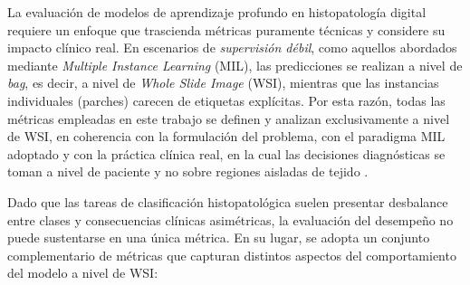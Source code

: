 
La evaluación de modelos de aprendizaje profundo en histopatología digital requiere un enfoque que trascienda métricas puramente técnicas y considere su impacto clínico real. En escenarios de \textit{supervisión débil}, como aquellos abordados mediante \textit{Multiple Instance Learning} (MIL), las predicciones se realizan a nivel de \textit{bag}, es decir, a nivel de \textit{Whole Slide Image} (WSI), mientras que las instancias individuales (parches) carecen de etiquetas explícitas. Por esta razón, todas las métricas empleadas en este trabajo se definen y analizan exclusivamente a nivel de WSI, en coherencia con la formulación del problema, con el paradigma MIL adoptado y con la práctica clínica real, en la cual las decisiones diagnósticas se toman a nivel de paciente y no sobre regiones aisladas de tejido \cite{campanella2019clinical} \cite{zhou2018brief}.\newline

Dado que las tareas de clasificación histopatológica suelen presentar desbalance entre clases y consecuencias clínicas asimétricas, la evaluación del desempeño no puede sustentarse en una única métrica. En su lugar, se adopta un conjunto complementario de métricas que capturan distintos aspectos del comportamiento del modelo a nivel de WSI:

